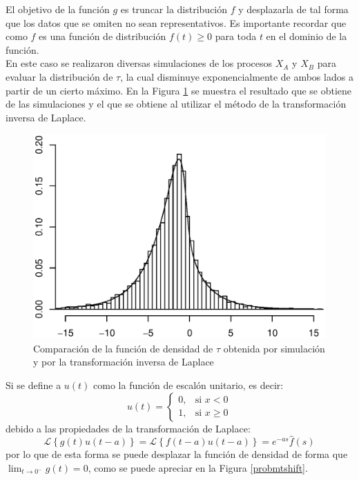 \documentclass[11pt]{article}
\numberwithin{equation}{section} %
\begin{document}
El objetivo de la función $g$ es truncar la distribución $f$ y desplazarla de tal forma que los datos que se omiten no sean representativos. Es importante recordar que como $f$ es una función de distribución $f(t)\geq 0$ para toda $t$ en el dominio de la función.\\

En este caso se realizaron diversas simulaciones de los procesos $X_A$ y $X_B$ para evaluar la distribución de $\tau$, la cual disminuye exponencialmente de ambos lados a partir de un cierto máximo. En la Figura \ref{probmt} se muestra el resultado que se obtiene de las simulaciones y el que se obtiene al utilizar el método de la transformación inversa de Laplace.\\

\begin{figure}[htbp] \centering
\includegraphics[scale=0.75,trim=0 1cm 0 1cm]{probpm.eps}
\caption{Comparación de la función de densidad de $\tau$ obtenida por simulación y por la transformación inversa de Laplace}
\label{probmt}
\end{figure}

Si se define a $u(t)$ como la función de escalón unitario, es decir:
\[
u(t) =
\begin{cases}
0, & \mbox{si } x<0 \\
1, & \mbox{si } x\geq0
\end{cases}
\]
debido a las propiedades de la transformación de Laplace:
\[
\mathcal{L} \left\{g(t)u(t-a)\right\}=\mathcal{L} \left\{f(t-a)u(t-a)\right\}=e^{-as}\hat{f}(s)
\]
por lo que de esta forma se puede desplazar la función de densidad de forma que $\lim_{t\to 0^-} g(t)=0$, como se puede apreciar en la Figura \ref{probmtshift}.\\
\end{document}
